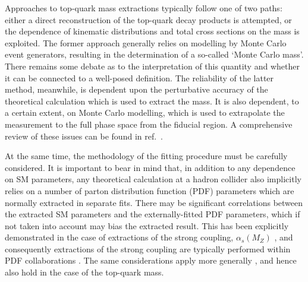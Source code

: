 \documentclass[sn-mathphys]{sn-jnl}%
\newcommand{\as}{\alpha_s(M_Z)}
\begin{document}
Approaches to top-quark mass extractions typically follow one of two paths: either a direct reconstruction of the top-quark decay products is attempted, or the dependence of kinematic distributions and total cross sections on the mass is exploited. The former approach generally relies on modelling by Monte Carlo event generators, resulting in the determination of a so-called `Monte Carlo mass'. There remains some debate as to the interpretation of this quantity and whether it can be connected to a well-posed definition. The reliability of the latter method, meanwhile, is dependent upon the perturbative accuracy of the theoretical calculation which is used to extract the mass. It is also dependent, to a certain extent, on Monte Carlo modelling, which is used to extrapolate the measurement to the full phase space from the fiducial region. A comprehensive review of these issues can be found in ref.~\cite{Corcella:2019tgt}.

At the same time, the methodology of the fitting procedure must be carefully considered. It is important to bear in mind that, in addition to any dependence on SM parameters, any theoretical calculation at a hadron collider also implicitly relies on a number of parton distribution function (PDF) parameters which are normally extracted in separate fits. There may be significant correlations between the extracted SM parameters and the externally-fitted PDF parameters, which if not taken into account may bias the extracted result. This has been explicitly demonstrated in the case of extractions of the strong coupling, $\as$ \cite{Forte:2020pyp}, and consequently extractions of the strong coupling are typically performed within PDF collaborations \cite{Ball:2018iqk,Hou:2019efy,Cridge:2021qfd,H1:2021xxi,dEnterria:2022hzv}. The same considerations apply more generally \cite{Carrazza:2019sec, Greljo:2021kvv}, and hence also hold in the case of the top-quark mass.
\end{document}
